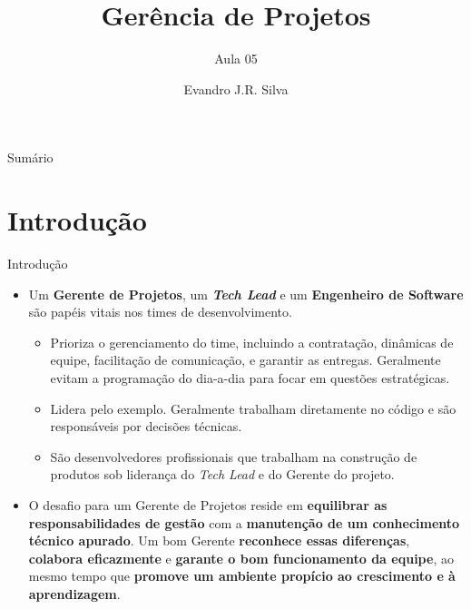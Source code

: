\documentclass{beamer}
\title[GP 05]{Gerência de Projetos}
\subtitle{Aula 05}
\author[E.J.R. Silva]{Evandro J.R. Silva}
\date{}
\begin{document}
	
\begin{frame}
	\titlepage
\end{frame}
	
\begin{frame}{Sumário}
	\tableofcontents
\end{frame}
	
\section{Introdução}
	
\begin{frame}{Introdução}
	\justifying
	\begin{itemize}
		\justifying
		\item<1-4> Um \alert<2>{\textbf{Gerente de Projetos}}, um \alert<3>{\textbf{\textit{Tech Lead}}} e um \alert<4>{\textbf{Engenheiro de Software}} são papéis vitais nos times de desenvolvimento.
			\begin{itemize}
				\justifying
				\item<2> Prioriza o gerenciamento do time, incluindo a contratação, dinâmicas de equipe, facilitação de comunicação, e garantir as entregas. Geralmente evitam a programação do dia-a-dia para focar em questões estratégicas.
				\item<3> Lidera pelo exemplo. Geralmente trabalham diretamente no código e são responsáveis por decisões técnicas.
				\item<4> São desenvolvedores profissionais que trabalham na construção de produtos sob liderança do \textit{Tech Lead} e do Gerente do projeto.
			\end{itemize}
		\item<5> O desafio para um Gerente de Projetos reside em \textbf{equilibrar as responsabilidades de gestão} com a \textbf{manutenção de um conhecimento técnico apurado}. Um bom Gerente \textbf{reconhece essas diferenças}, \textbf{colabora eficazmente} e \textbf{garante o bom funcionamento da equipe}, ao mesmo tempo que \textbf{promove um ambiente propício ao crescimento e à aprendizagem}.
	\end{itemize}
\end{frame}

\end{document}
